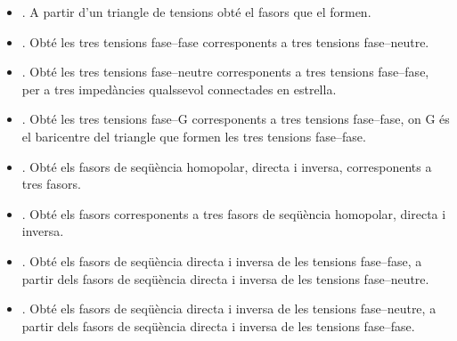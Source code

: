 \begin{itemize}
   \item {}. A partir d'un triangle de tensions obté el fasors que el formen.
   \item {}. Obté les tres tensions fase--fase corresponents a tres tensions fase--neutre.
   \item {}. Obté les tres tensions fase--neutre corresponents a tres tensions fase--fase, per a tres impedàncies qualssevol connectades en estrella.
   \item {}. Obté les tres tensions fase--G corresponents a tres tensions fase--fase, on G és el baricentre del triangle que formen les tres tensions fase--fase.
   \item {}. Obté els fasors de seqüència homopolar, directa i inversa, corresponents a tres fasors.
   \item {}. Obté els  fasors corresponents a tres fasors de seqüència homopolar, directa i inversa.
   \item {}. Obté els fasors de seqüència directa i inversa de les tensions fase--fase, a partir dels fasors de seqüència directa i inversa de les tensions fase--neutre.
   \item {}. Obté els fasors de seqüència directa i inversa de les tensions fase--neutre, a partir dels fasors de seqüència directa i inversa de les tensions fase--fase.
\end{itemize}

